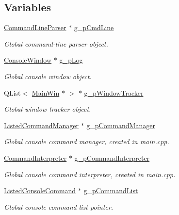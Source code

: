 \subsection*{Variables}
\begin{DoxyCompactItemize}
\item 
\hyperlink{class_command_line_parser}{Command\-Line\-Parser} $\ast$ \hyperlink{group___global_variables_ga270fc6d9322b018e011978d6376f43ba}{g\-\_\-p\-Cmd\-Line}
\begin{DoxyCompactList}\small\item\em Global command-\/line parser object. \end{DoxyCompactList}\item 
\hyperlink{class_console_window}{Console\-Window} $\ast$ \hyperlink{group___global_variables_gae2d76408535137add345d6e4258c5a07}{g\-\_\-p\-Log}
\begin{DoxyCompactList}\small\item\em Global console window object. \end{DoxyCompactList}\item 
Q\-List$<$ \hyperlink{class_main_win}{Main\-Win} $\ast$ $>$ $\ast$ \hyperlink{group___global_variables_gab5d481b5087f9956e533067ad8001d78}{g\-\_\-p\-Window\-Tracker}
\begin{DoxyCompactList}\small\item\em Global window tracker object. \end{DoxyCompactList}\item 
\hyperlink{class_listed_command_manager}{Listed\-Command\-Manager} $\ast$ \hyperlink{group___global_variables_ga4d39defaa5d22f29bde4c75d590bd0fe}{g\-\_\-p\-Command\-Manager}
\begin{DoxyCompactList}\small\item\em Global console command manager, created in main.\-cpp. \end{DoxyCompactList}\item 
\hypertarget{group___global_variables_ga347a4723fad5c3711958f787dfc93fa4}{\hyperlink{class_command_interpreter}{Command\-Interpreter} $\ast$ \hyperlink{group___global_variables_ga347a4723fad5c3711958f787dfc93fa4}{g\-\_\-p\-Command\-Interpreter}}\label{group___global_variables_ga347a4723fad5c3711958f787dfc93fa4}

\begin{DoxyCompactList}\small\item\em Global console command interpreter, created in main.\-cpp. \end{DoxyCompactList}\item 
\hyperlink{class_listed_console_command}{Listed\-Console\-Command} $\ast$ \hyperlink{group___global_variables_ga8389c826239a1bc627ae3b7f97a79fe4}{g\-\_\-p\-Command\-List}
\begin{DoxyCompactList}\small\item\em Global console command list pointer. \end{DoxyCompactList}\end{DoxyCompactItemize}


